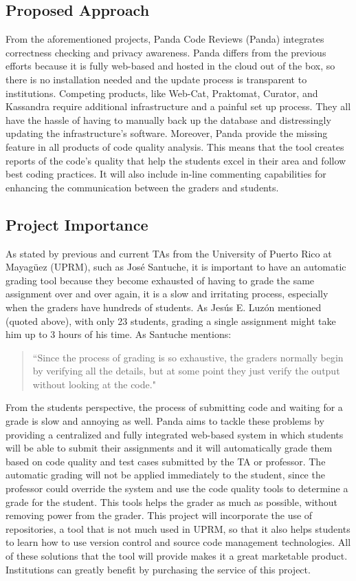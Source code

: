 
\subsection{Proposed Approach}

From the aforementioned projects, Panda Code Reviews (Panda) integrates
correctness checking and privacy awareness. Panda differs from the previous
efforts because it is fully web-based and hosted in the cloud out of the box, so
there is no installation needed and the update process is transparent to
institutions. Competing products, like Web-Cat, Praktomat, Curator, and
Kassandra require additional infrastructure and a painful set up process. They
all have the hassle of having to manually back up the database and distressingly
updating the infrastructure's software. Moreover, Panda provide the missing
feature in all products of code quality analysis. This means that the tool creates
reports of the code's quality that help the students excel in their area and
follow best coding practices. It will also include in-line commenting
capabilities for enhancing the communication between the graders and students.

\subsection{Project Importance}

As stated by previous and current TAs from the University of Puerto Rico at Mayagüez (UPRM), such as José
Santuche, it is important to have an automatic grading tool because they become
exhausted of having to grade the same assignment over and over again, it is a
slow and irritating process, especially when the graders have hundreds of
students. As Jesús E. Luzón mentioned (quoted above), with only 23 students,
grading a single assignment might take him up to 3 hours of his time. As
Santuche mentions: \begin{quote} ``Since the process of grading is so exhaustive,
the graders normally begin by verifying all the details, but at some point they
just verify the output without looking at the code." \end{quote} From the
students perspective, the process of submitting code and waiting for a grade is
slow and annoying as well. Panda aims to tackle these problems by providing a
centralized and fully integrated web-based system in which students will be able
to submit their assignments and it will automatically grade them based on code
quality and test cases submitted by the TA or professor. The automatic grading
will not be applied immediately to the student, since the professor could
override the system and use the code quality tools to determine a grade for the
student. This tools helps the grader as much as possible, without removing power
from the grader. This project will incorporate the use of repositories, a tool
that is not much used in UPRM, so that it also helps students to learn
how to use version control and source code management technologies. All of
these solutions that the tool will provide makes it a great marketable product.
Institutions can greatly benefit by purchasing the service of this project.

